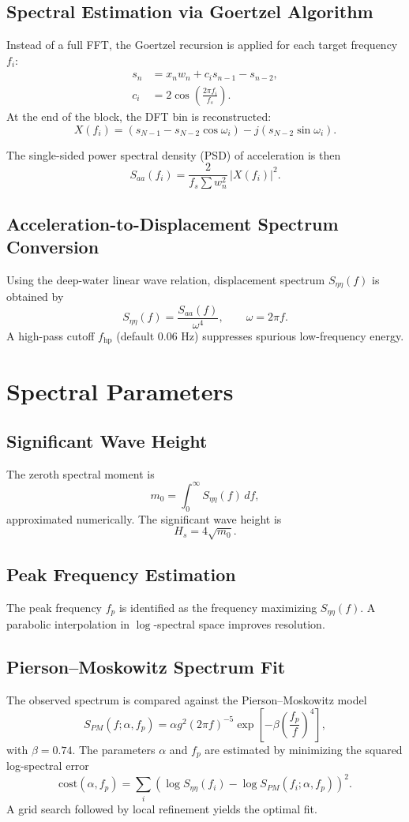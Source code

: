 \documentclass[11pt]{article}
\begin{document}
\subsection{Spectral Estimation via Goertzel Algorithm}
Instead of a full FFT, the Goertzel recursion is applied for each target frequency $f_i$:
\begin{align}
s_n &= x_n w_n + c_i s_{n-1} - s_{n-2}, \\
c_i &= 2\cos\!\left(\frac{2\pi f_i}{f_s}\right).
\end{align}
At the end of the block, the DFT bin is reconstructed:
\[
X(f_i) = (s_{N-1} - s_{N-2}\cos\omega_i) - j (s_{N-2}\sin\omega_i).
\]

The single-sided power spectral density (PSD) of acceleration is then
\[
S_{aa}(f_i) = \frac{2}{f_s \sum w_n^2} \, |X(f_i)|^2.
\]

\subsection{Acceleration-to-Displacement Spectrum Conversion}
Using the deep-water linear wave relation, displacement spectrum $S_{\eta\eta}(f)$ is obtained by
\[
S_{\eta\eta}(f) = \frac{S_{aa}(f)}{\omega^4}, \qquad \omega = 2\pi f.
\]
A high-pass cutoff $f_\text{hp}$ (default $0.06$ Hz) suppresses spurious low-frequency energy.

\section{Spectral Parameters}
\subsection{Significant Wave Height}
The zeroth spectral moment is
\[
m_0 = \int_0^\infty S_{\eta\eta}(f)\, df,
\]
approximated numerically. The significant wave height is
\[
H_s = 4\sqrt{m_0}.
\]

\subsection{Peak Frequency Estimation}
The peak frequency $f_p$ is identified as the frequency maximizing $S_{\eta\eta}(f)$. A parabolic interpolation in $\log$-spectral space improves resolution.

\subsection{Pierson--Moskowitz Spectrum Fit}
The observed spectrum is compared against the Pierson--Moskowitz model
\[
S_{PM}(f;\alpha, f_p) = \alpha g^2 (2\pi f)^{-5} \exp\left[-\beta\left(\frac{f_p}{f}\right)^4\right],
\]
with $\beta = 0.74$. The parameters $\alpha$ and $f_p$ are estimated by minimizing the squared log-spectral error
\[
\text{cost}(\alpha,f_p) = \sum_i \left(\log S_{\eta\eta}(f_i) - \log S_{PM}(f_i;\alpha,f_p)\right)^2.
\]
A grid search followed by local refinement yields the optimal fit.
\end{document}
